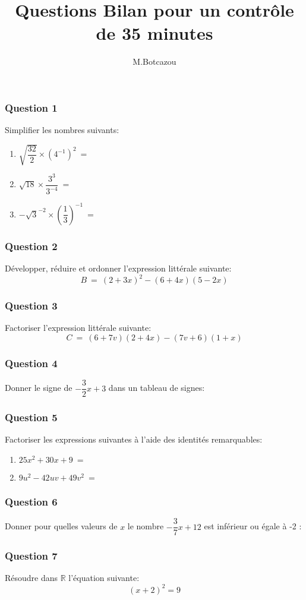 \documentclass[t,12pt]{beamer}
\title{Questions Bilan pour un contrôle de 35 minutes}
\author{M.Botcazou}
\date{}
\newcommand{\R}{\mathbb{R}}
\begin{document}
\maketitle	

\begin{frame}
	\frametitle{Question 1}
	Simplifier les nombres suivants:\bigskip
	\begin{enumerate}
		\item $\sqrt{\dfrac{32}{2}}\times (4^{-1})^2 \ = \ $\bigskip
		\item $\sqrt{18}\times \dfrac{3^3}{3^{-4}} \ = \  $ \bigskip
		\item  $-\sqrt{3}^{-2} \times \left(\dfrac{1}{3}\right)^{-1} \ = \ $
	\end{enumerate}
\end{frame}

\begin{frame}
\frametitle{Question 2}
Développer, réduire et ordonner l'expression littérale suivante:
$$B \ = \ (2 + 3x)^2 - (6 + 4x)(5 - 2x)$$
\end{frame}

\begin{frame}
	\frametitle{Question 3}
		Factoriser l'expression littérale suivante:
	$$C \ = \ (6 + 7v)(2 + 4x) - (7v + 6)(1 + x) $$
\end{frame}

\begin{frame}
	\frametitle{Question 4}
	Donner le signe de $-\dfrac{3}{2}x+3$ dans un tableau de signes:
\end{frame}

\begin{frame}
	\frametitle{Question 5}
	Factoriser les expressions suivantes à l'aide des identités remarquables: \\[0.5cm]
	\begin{enumerate}
		\item $25x^2 + 30x +9 \ = \ $\bigskip \bigskip \bigskip \bigskip \bigskip 
		\item $ 9u^2 -42uv  +49v^2\ = \ $ \bigskip
	\end{enumerate}
\end{frame}


\begin{frame}
	\frametitle{Question 6}
 	Donner pour quelles valeurs de $x$ le nombre $-\dfrac{3}{7}x+12$ est inférieur ou égale à -2 :\bigskip

\end{frame}


\begin{frame}
	\frametitle{Question 7}
	Résoudre dans $\R$ l'équation suivante: 
	$$(x+2)^2 = 9$$
\end{frame}
\end{document}
